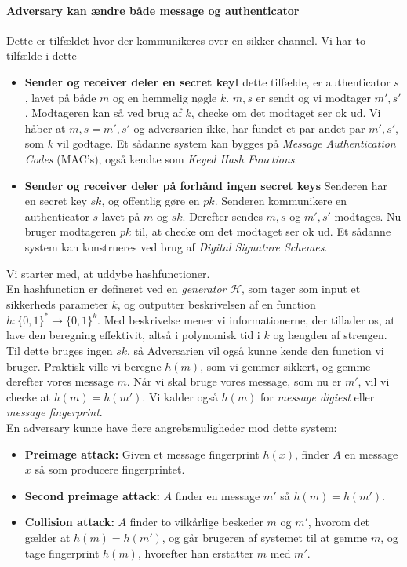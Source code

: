 \documentclass[paper=a4, fontsize=11pt]{scrartcl} %
\numberwithin{equation}{section} %
\numberwithin{figure}{section} %
\numberwithin{table}{section} %
\begin{document}
	\paragraph{\textbf{Adversary kan ændre både message og authenticator}} Dette er tilfældet hvor der kommunikeres over en sikker channel. Vi har to tilfælde i dette
	\begin{itemize}
		\item \textbf{Sender og receiver deler en secret key}\hspace{0.3cm}I dette tilfælde, er authenticator $s$, lavet på både $m$ og en hemmelig nøgle $k$. $m,s$ er sendt og vi modtager $m',s'$. Modtageren kan så ved brug af $k$, checke om det modtaget ser ok ud. Vi håber at $m,s=m',s'$ og adversarien ikke, har fundet et par andet par $m',s'$, som $k$ vil godtage. Et sådanne system kan bygges på \textit{Message Authentication Codes} (MAC's), også kendte som \textit{Keyed Hash Functions}.
		\item \textbf{Sender og receiver deler på forhånd ingen secret keys} Senderen har en secret key $sk$, og offentlig gøre en $pk$. Senderen kommunikere en authenticator $s$ lavet på $m$ og $sk$. Derefter sendes $m,s$ og $m',s'$ modtages. Nu bruger modtageren $pk$ til, at checke om det modtaget ser ok ud. Et sådanne system kan konstrueres ved brug af \textit{Digital Signature Schemes}.
	\end{itemize}
	 
	 Vi starter med, at uddybe hashfunctioner. \\
	 
	 En hashfunction er defineret ved en \textit{generator} $\mathcal{H}$, som tager som input et sikkerheds parameter $k$, og outputter beskrivelsen af en function $h:\{0,1\}^*\rightarrow\{0,1\}^k$. Med beskrivelse mener vi informationerne, der tillader os, at lave den beregning effektivit, altså i polynomisk tid i $k$ og længden af strengen. Til dette bruges ingen $sk$, så Adversarien vil også kunne kende den function vi bruger. Praktisk ville vi beregne $h(m)$, som vi gemmer sikkert, og gemme derefter vores message $m$. Når vi skal bruge vores message, som nu er $m'$, vil vi checke at $h(m)=h(m')$. Vi kalder også $h(m)$ for \textit{message digiest} eller \textit{message fingerprint}. \\
	 
	 En adversary kunne have flere angrebsmuligheder mod dette system:
	 \begin{itemize}
	 	\item \textbf{Preimage attack:} Given et message fingerprint $h(x)$, finder $A$ en message $x$ så som producere fingerprintet. 
	 	\item \textbf{Second preimage attack:} $A$ finder en message $m'$ så $h(m)=h(m')$.
	 	\item \textbf{Collision attack:} $A$ finder to vilkårlige beskeder $m$ og $m'$, hvorom det gælder at $h(m)=h(m')$, og går brugeren af systemet til at gemme $m$, og tage fingerprint $h(m)$, hvorefter han erstatter $m$ med $m'$.
	 \end{itemize}
	
\end{document}
